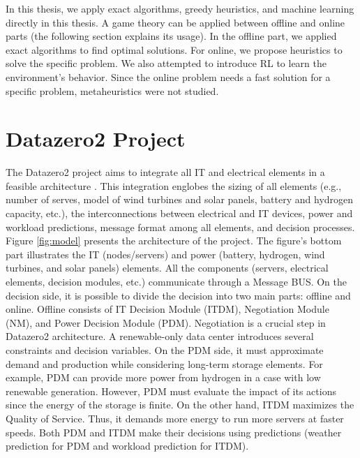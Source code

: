 In this thesis, we apply exact algorithms, greedy heuristics, and machine learning directly in this thesis. A game theory can be applied between offline and online parts (the following section explains its usage). In the offline part, we applied exact algorithms to find optimal solutions. For online, we propose heuristics to solve the specific problem. We also attempted to introduce RL to learn the environment's behavior. Since the online problem needs a fast solution for a specific problem, metaheuristics were not studied.

\section{Datazero2 Project}
\label{sec:datazero2_project}

The Datazero2 project aims to integrate all IT and electrical elements in a feasible architecture \cite{Datazero}. This integration englobes the sizing of all elements (e.g., number of serves, model of wind turbines and solar panels, battery and hydrogen capacity, etc.), the interconnections between electrical and IT devices, power and workload predictions, message format among all elements, and decision processes. Figure \ref{fig:model} presents the architecture of the project. The figure's bottom part illustrates the IT (nodes/servers) and power (battery, hydrogen, wind turbines, and solar panels) elements. All the components (servers, electrical elements, decision modules, etc.) communicate through a Message BUS. On the decision side, it is possible to divide the decision into two main parts: offline and online. Offline consists of IT Decision Module (ITDM), Negotiation Module (NM), and Power Decision Module (PDM). Negotiation is a crucial step in Datazero2 architecture. A renewable-only data center introduces several constraints and decision variables. On the PDM side, it must approximate demand and production while considering long-term storage elements. For example, PDM can provide more power from hydrogen in a case with low renewable generation. However, PDM must evaluate the impact of its actions since the energy of the storage is finite. On the other hand, ITDM maximizes the Quality of Service. Thus, it demands more energy to run more servers at faster speeds. Both PDM and ITDM make their decisions using predictions (weather prediction for PDM and workload prediction for ITDM).

